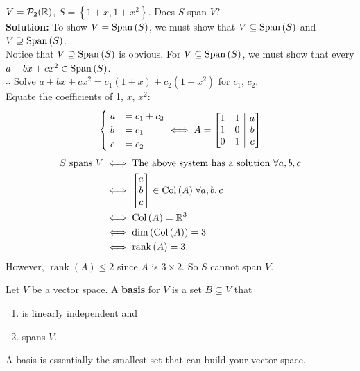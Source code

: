 \begin{example}
    $V = \mathcal{P}_2({\mathbb{R}})$, $S = \left\{  1+x, 1+x^2 \right\}$. Does $S$ span $V$? \\
    \textbf{Solution: }
    To show $V = \operatorname{Span}{(S)}$, we must show that $V \subseteq \operatorname{Span}{(S)}$ and $V \supseteq \operatorname{Span}{(S)}$. \\
    Notice that $V \supseteq \operatorname{Span}{(S)}$ is obvious. For $V \subseteq \operatorname{Span}{(S)}$, we must show that every $a + bx + cx^2 \in \operatorname{Span}{(S)}$. \\
    $\therefore$ Solve $a + bx + cx^2 = c_1(1+x) + c_2(1+x^2)$ for $c_1$, $c_2$. \\
    Equate the coefficients of 1, $x$, $x^2$:
    \[\begin{cases}
        \; a & = c_1 + c_2 \\ 
        \; b & = c_1 \\
        \; c &= c_2
      \end{cases}
      \iff A = 
      \left[
        \begin{array}{@{}cc|c@{}}
            1 & 1 & a \\
            1 & 0 & b \\
            0 & 1 & c
        \end{array}
      \right]
    \]
    \vspace{-8mm}
    \begin{align*}
        S \text{ spans } V &\iff \text{The above system has a solution } \forall a, b, c \\
        &\iff \begin{bmatrix} a \\ b \\ c \end{bmatrix} \in \operatorname{Col}{(A)} \; \forall a, b, c \\
        &\iff \operatorname{Col}{(A)} = {\mathbb{R}}^3 \\
        &\iff \operatorname{dim}{(\operatorname{Col}{(A)})} = 3 \\
        &\iff \operatorname{rank}{(A)} = 3.
    \end{align*}
    However, $\operatorname{rank}{(A)} \leq 2$ since $A$ is $3 \times 2$. So $S$ cannot span $V$.
\end{example}


\begin{definition}
    Let $V$ be a vector space. A \textbf{basis} for $V$ is a set $B \subseteq V$ that 
    \begin{enumerate}[label=(\arabic*)]
        \item is linearly independent and
        \item spans $V$.
    \end{enumerate}
\end{definition}
\begin{remark}
    A basis is essentially the smallest set that can build your vector space.
\end{remark}

